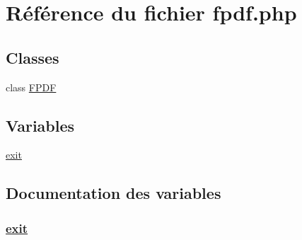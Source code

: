 \hypertarget{pdf_2fpdf_8php}{
\section{R\'{e}f\'{e}rence du fichier fpdf.php}
\label{pdf_2fpdf_8php}
}
\subsection*{Classes}
\begin{CompactItemize}
\item 
class \hyperlink{classFPDF}{FPDF}
\end{CompactItemize}
\subsection*{Variables}
\begin{CompactItemize}
\item 
\hyperlink{pdf_2fpdf_8php_a0}{exit}
\end{CompactItemize}


\subsection{Documentation des variables}
\hypertarget{pdf_2fpdf_8php_a0}{
\subsubsection[exit]{\setlength{\rightskip}{0pt plus 5cm}\hyperlink{pdf_2fpdf_8php_a0}{exit}}}
\label{pdf_2fpdf_8php_a0}


